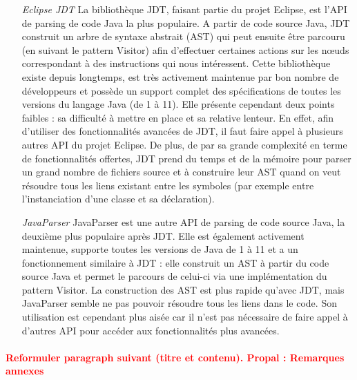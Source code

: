 \documentclass{scrartcl}
\newcommand{\TODO}[1] {
    \noindent \paragraph{\textcolor{red}{#1}}
}
\begin{document}
\begin{itemize}
            \begin{itemize}
            	\item[\textit{Eclipse JDT}] La bibliothèque JDT, faisant partie du projet Eclipse, est l'API de parsing de code Java la plus populaire. A partir de code source Java, JDT construit un arbre de syntaxe abstrait (AST) qui peut ensuite être parcouru (en suivant le pattern Visitor) afin d'effectuer certaines actions sur les nœuds correspondant à des instructions qui nous intéressent. Cette bibliothèque existe depuis longtemps, est très activement maintenue par bon nombre de développeurs et possède un support complet des spécifications de toutes les versions du langage Java (de 1 à 11). Elle présente cependant deux points faibles : sa difficulté à mettre en place et sa relative lenteur. En effet, afin d'utiliser des fonctionnalités avancées de JDT, il faut faire appel à plusieurs autres API du projet Eclipse. De plus, de par sa grande complexité en terme de fonctionnalités offertes, JDT prend du temps et de la mémoire pour parser un grand nombre de fichiers source et à construire leur AST quand on veut résoudre tous les liens existant entre les symboles (par exemple entre l'instanciation d'une classe et sa déclaration).
            	\item[\textit{JavaParser}\footnotemark]  JavaParser est une autre API de parsing de code source Java, la deuxième plus populaire après JDT. Elle est également activement maintenue, supporte toutes les versions de Java de 1 à 11 et a un fonctionnement similaire à JDT : elle construit un AST à partir du code source Java et permet le parcours de celui-ci via une implémentation du pattern Visitor. La construction des AST est plus rapide qu'avec JDT, mais JavaParser semble ne pas pouvoir résoudre tous les liens dans le code. Son utilisation est cependant plus aisée car il n'est pas nécessaire de faire appel à d'autres API pour accéder aux fonctionnalités plus avancées.
            \end{itemize}
        \end{itemize}
        
        \TODO{Reformuler paragraph suivant (titre et contenu). Propal : Remarques annexes}
\end{document}
